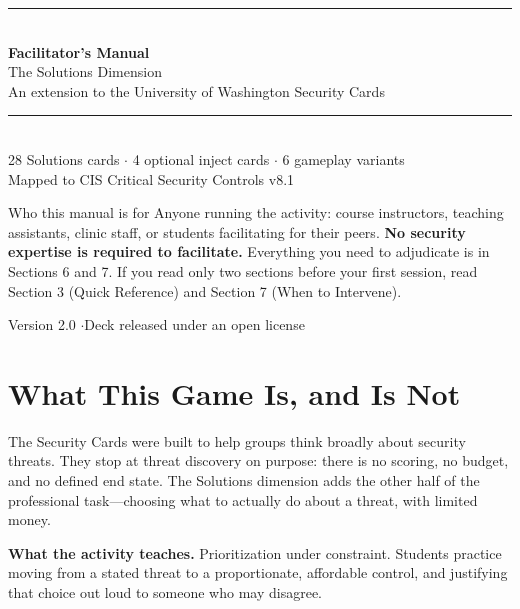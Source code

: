 \documentclass[11pt,letterpaper]{article}
\begin{document}
\begin{titlepage}
\centering
\vspace*{2.2cm}
{\color{deep}\rule{\textwidth}{2pt}}\\[0.8em]
{\Huge\bfseries\color{deep} Facilitator's Manual}\\[0.6em]
{\LARGE The Solutions Dimension}\\[0.4em]
{\large An extension to the University of Washington Security Cards}\\[0.5em]
{\color{deep}\rule{\textwidth}{2pt}}\\[2.2cm]

{\large 28 Solutions cards $\cdot$ 4 optional inject cards $\cdot$ 6 gameplay variants}\\[0.4em]
{\large Mapped to CIS Critical Security Controls v8.1}\\[3cm]

\begin{minipage}{0.82\textwidth}
\begin{note}{Who this manual is for}
Anyone running the activity: course instructors, teaching assistants,
clinic staff, or students facilitating for their peers. \textbf{No security
expertise is required to facilitate.} Everything you need to adjudicate is in
Sections 6 and 7. If you read only two sections before your first session, read
Section 3 (Quick Reference) and Section 7 (When to Intervene).
\end{note}
\end{minipage}

\vfill
{\small Version 2.0 \quad$\cdot$\quad Deck released under an open license}
\end{titlepage}

\tableofcontents
\newpage

\section{What This Game Is, and Is Not}

The Security Cards were built to help groups think broadly about security
threats. They stop at threat discovery on purpose: there is no scoring, no
budget, and no defined end state. The Solutions dimension adds the other half of
the professional task---choosing what to actually do about a threat, with
limited money.

\textbf{What the activity teaches.} Prioritization under constraint. Students
practice moving from a stated threat to a proportionate, affordable control, and
justifying that choice out loud to someone who may disagree.
\end{document}
